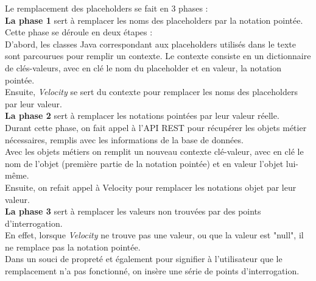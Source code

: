 Le remplacement des placeholders se fait en 3 phases : \\

\textbf{La phase 1} sert à remplacer les noms des placeholders par la notation pointée.\\
Cette phase se déroule en deux étapes : \\
D'abord, les classes Java correspondant aux placeholders utilisés dans le texte sont parcourues pour remplir un contexte. Le contexte consiste en un dictionnaire de clés-valeurs, avec en clé le nom du placeholder et en valeur, la notation pointée.\\
Ensuite, \textit{Velocity} se sert du contexte pour remplacer les noms des placeholders par leur valeur.\\

\textbf{La phase 2} sert à remplacer les notations pointées par leur valeur réelle.\\
Durant cette phase, on fait appel à l'API REST pour récupérer les objets métier nécessaires, remplis avec les informations de la base de données.\\
Avec les objets métiers on remplit un nouveau contexte clé-valeur, avec en clé le nom de l'objet (première partie de la notation pointée) et en valeur l'objet lui-même.\\
Ensuite, on refait appel à Velocity pour remplacer les notations objet par leur valeur.\\

\textbf{La phase 3} sert à remplacer les valeurs non trouvées par des points d'interrogation.\\
En effet, lorsque \textit{Velocity} ne trouve pas une valeur, ou que la valeur est "null", il ne remplace pas la notation pointée.\\
Dans un souci de propreté et également pour signifier à l'utilisateur que le remplacement n'a pas fonctionné, on insère une série de points d'interrogation.

